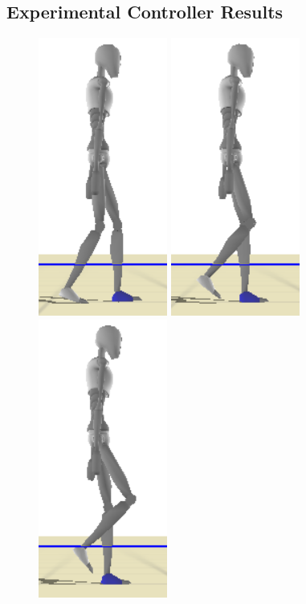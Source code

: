 \documentclass[conference]{acmsiggraph}
\begin{document}
\subsection{Experimental Controller Results}
\begin{figure}[t]
\centering
\includegraphics[scale=0.17]{images/strips/0_25/1.png}
\includegraphics[scale=0.17]{images/strips/0_25/2.png}
\includegraphics[scale=0.17]{images/strips/0_25/3.png}

\end{figure}
\end{document}
